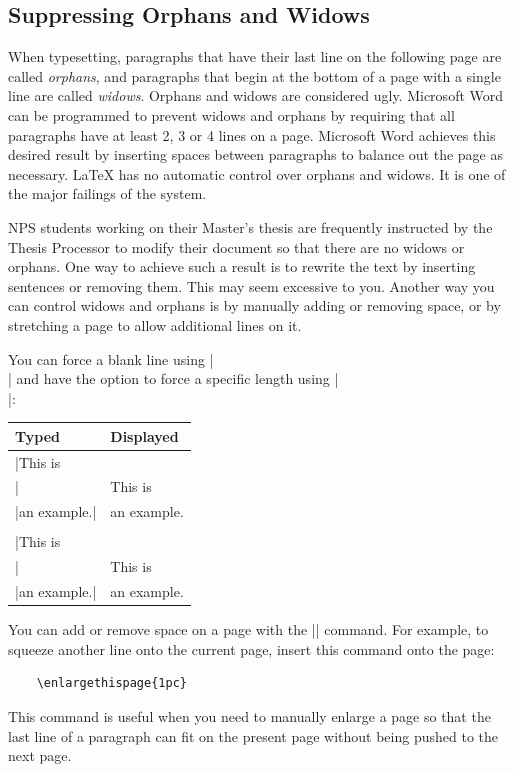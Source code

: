 \subsection{Suppressing Orphans and Widows}
When typesetting, paragraphs that have
their last line on the following page are called \emph{orphans}, and
paragraphs that begin at the bottom of a page with a single line are
called \emph{widows}. Orphans and widows are considered
ugly. Microsoft Word can be programmed to prevent widows and orphans
by requiring that all paragraphs have at least 2, 3 or 4 lines on a
page. Microsoft Word achieves this desired result by inserting spaces
between paragraphs to balance out the page as necessary. \LaTeX{} has
no automatic control over orphans and widows. It is one of the major
failings of the system.

NPS students working on their Master's thesis are frequently
instructed by the Thesis Processor to modify their document so that
there are no widows or orphans. One way to achieve such a
result is to rewrite the text by inserting sentences or removing
them. This may seem excessive to you. Another way you can control
widows and orphans is by manually adding or removing space, or by
stretching a page to allow additional lines on it.

You can force a blank line using |\\| and have the option to force a
specific length using |\\[3pt]|:
\begin{center}
\begin{tabular}{l|l}
Typed        & Displayed\\\hline
|This is\\|  & This is\\
|an example.| & an example.\\
\\
|This is\\[3pt]|  & This is\\[3pt]
|an example.| & an example.
\end{tabular}
\end{center}

You can add or remove space on a page with the |\enlargethispage| command. For
example, to squeeze another line onto the current page, insert this
command onto the page:

\begin{verbatim}
    \enlargethispage{1pc}
\end{verbatim}

This command is useful when you need to manually enlarge a
page so that the last line of a paragraph can fit on the present page
without being pushed to the next page. 

